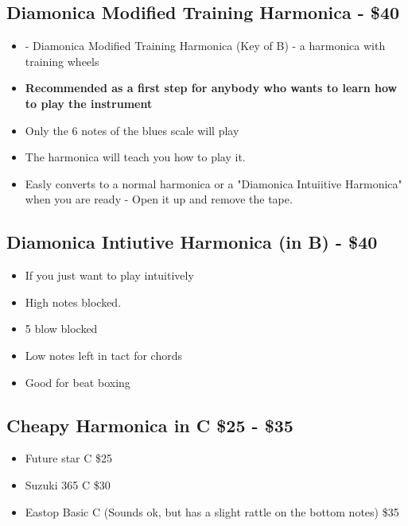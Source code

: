    \subsection*{Diamonica Modified Training Harmonica - \$40}
            \begin{itemize}
                \item - Diamonica Modified Training Harmonica (Key of B) - a harmonica with training wheels
                \item \textbf{Recommended as a first step for anybody who wants to learn how to play the instrument}
                \item Only the 6 notes of the blues scale will play 
                \item The harmonica will teach you how to play it.
                \item Easly converts to a normal harmonica or a "Diamonica Intuiitive Harmonica" when you are ready - Open it up and remove the tape.
            \end{itemize}


        \subsection*{Diamonica Intiutive Harmonica (in B) - \$40}
            \begin{itemize}
                \item If you just want to play intuitively 
                \item High notes blocked. 
                \item 5 blow blocked 
                \item Low notes left in tact for chords
                \item Good for beat boxing
            \end{itemize}
            
        \subsection*{Cheapy Harmonica in C \$25 - \$35}
                \begin{itemize}
                    \item Future star C	\$25
                    \item Suzuki 365 C \$30
                    \item Eastop Basic C (Sounds ok, but has a slight rattle on the bottom notes) \$35
                \end{itemize}
            
